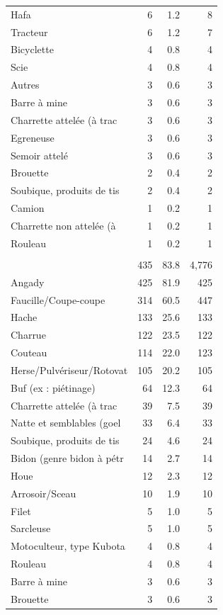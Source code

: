 \documentclass[
  french,
  letterpaper,
]{report}
\begin{document}
\begin{table}
\begin{tabular*}{\linewidth}{@{\extracolsep{\fill}}lrrr}
Hafa & 6 & 1.2 & 8 \\ 
Tracteur & 6 & 1.2 & 7 \\ 
Bicyclette & 4 & 0.8 & 4 \\ 
Scie & 4 & 0.8 & 4 \\ 
Autres & 3 & 0.6 & 3 \\ 
Barre à mine & 3 & 0.6 & 3 \\ 
Charrette attelée (à trac & 3 & 0.6 & 3 \\ 
Egreneuse & 3 & 0.6 & 3 \\ 
Semoir attelé & 3 & 0.6 & 3 \\ 
Brouette & 2 & 0.4 & 2 \\ 
Soubique, produits de tis & 2 & 0.4 & 2 \\ 
Camion & 1 & 0.2 & 1 \\ 
Charrette non attelée (à & 1 & 0.2 & 1 \\ 
Rouleau & 1 & 0.2 & 1 \\ 
\midrule\addlinespace[2.5pt]
\multicolumn{4}{l}{{\bfseries {Marovoay}}} \\[2.5pt] 
\midrule\addlinespace[2.5pt]
 & 435 & 83.8 & 4,776 \\ 
Angady & 425 & 81.9 & 425 \\ 
Faucille/Coupe-coupe & 314 & 60.5 & 447 \\ 
Hache & 133 & 25.6 & 133 \\ 
Charrue & 122 & 23.5 & 122 \\ 
Couteau & 114 & 22.0 & 123 \\ 
Herse/Pulvériseur/Rotovat & 105 & 20.2 & 105 \\ 
Buf (ex : piétinage) & 64 & 12.3 & 64 \\ 
Charrette attelée (à trac & 39 & 7.5 & 39 \\ 
Natte et semblables (goel & 33 & 6.4 & 33 \\ 
Soubique, produits de tis & 24 & 4.6 & 24 \\ 
Bidon (genre bidon à pétr & 14 & 2.7 & 14 \\ 
Houe & 12 & 2.3 & 12 \\ 
Arrosoir/Sceau & 10 & 1.9 & 10 \\ 
Filet & 5 & 1.0 & 5 \\ 
Sarcleuse & 5 & 1.0 & 5 \\ 
Motoculteur, type Kubota & 4 & 0.8 & 4 \\ 
Rouleau & 4 & 0.8 & 4 \\ 
Barre à mine & 3 & 0.6 & 3 \\ 
Brouette & 3 & 0.6 & 3 \\ 

\end{tabular*}
\end{table}
\end{document}
